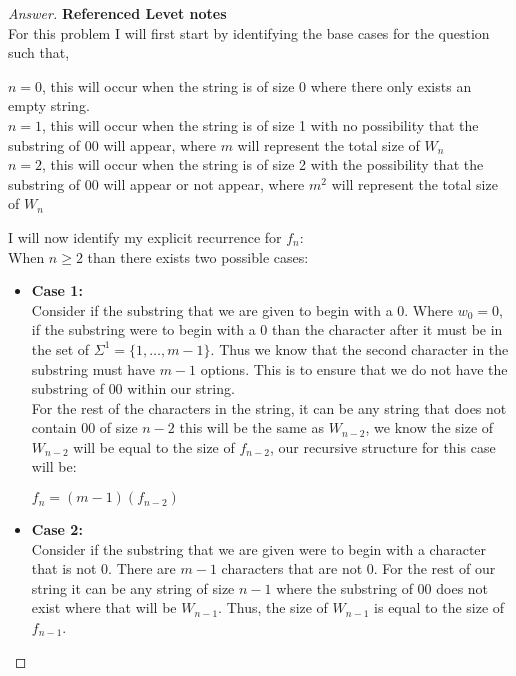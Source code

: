 \documentclass[11pt]{article}
\theoremstyle{definition}
\theoremstyle{definition}
\theoremstyle{definition}
\begin{document}
\begin{proof}[Answer] \textbf{Referenced Levet notes} \\
For this problem I will first start by identifying the base cases for the question such that, \\
\begin{center}
$n=0$, this will occur when the string is of size 0 where there only exists an empty string. \\

$n=1$, this will occur when the string is of size 1 with no possibility that the substring of $00$ will appear, where $m$ will represent the total size of $W_n$ \\

$n=2$, this will occur when the string is of size 2 with the possibility that the substring of $00$ will appear or not appear, where $m^2$ will represent the total size of $W_n$ \\
\end{center} 

I will now identify my explicit recurrence for $f_n$: \\

When $n \geq 2$ than there exists two possible cases: \\
\begin{itemize}
\item \textbf{Case 1:} \\
Consider if the substring that we are given to begin with a 0. Where $w_0 = 0$, if the substring were to begin with a 0 than the character after it must be in the set of $\Sigma^1= \{ 1, \ldots, m-1\}$. Thus we know that the second character in the substring must have $m-1$ options. This is to ensure that we do not have the substring of $00$ within our string. \\

For the rest of the characters in the string, it can be any string that does not contain $00$ of size $n-2$ this will be the same as $W_{n-2}$, we know the size of $W_{n-2}$ will be equal to the size of $f_{n-2}$, our recursive structure for this case will be: \\
\begin{center}
$f_n = (m-1)(f_{n-2})$
\end{center}
\item \textbf{Case 2:}\\
Consider if the substring that we are given were to begin with a character that is not 0. There are $m-1$ characters that are not 0. For the rest of our string it can be any string of size $n-1$ where the substring of $00$ does not exist where that will be $W_{n-1}$. Thus, the size of $W_{n-1}$ is equal to the size of $f_{n-1}$. 


\end{itemize}
\end{proof}
\end{document}
